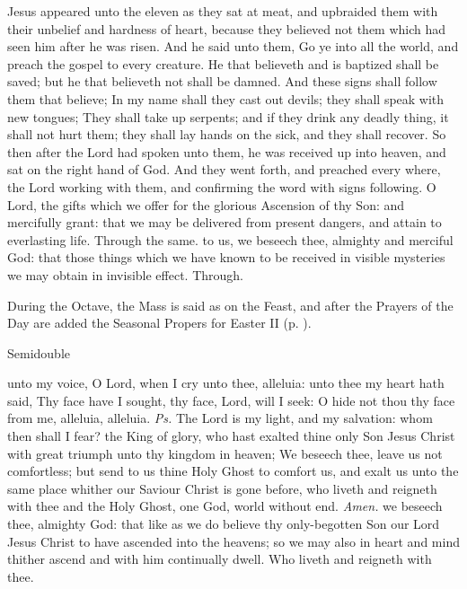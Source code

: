  Jesus appeared unto the eleven as they sat at meat, and upbraided them with their unbelief and hardness of heart, because they believed not them which had seen him after he was risen. And he said unto them, Go ye into all the world, and preach the gospel to every creature. He that believeth and is baptized shall be saved; but he that believeth not shall be damned. And these signs shall follow them that believe; In my name shall they cast out devils; they shall speak with new tongues; They shall take up serpents; and if they drink any deadly thing, it shall not hurt them; they shall lay hands on the sick, and they shall recover. So then after the Lord had spoken unto them, he was received up into heaven, and sat on the right hand of God. And they went forth, and preached every where, the Lord working with them, and confirming the word with signs following.
\secret
{} O Lord, the gifts which we offer for the glorious Ascension of thy Son: and mercifully grant: that we may be delivered from present dangers, and attain to everlasting life. Through the same.
\postcommunion
{} to us, we beseech thee, almighty and merciful God: that those things which we have known to be received in visible mysteries we may obtain in invisible effect. Through.
\begin{rubric}
    During the Octave, the Mass is said as on the Feast, and after the Prayers of the Day are added the Seasonal Propers for Easter II (p. \pageref{EasterII}).
\end{rubric}

\begin{inhead}
    {Semidouble}
\end{inhead}

\properantiphonfix

\introit
{} unto my voice, O Lord, when I cry unto thee, alleluia: unto thee my heart hath said, Thy face have I sought, thy face, Lord, will I seek: O hide not thou thy face from me, alleluia, alleluia. \textit{Ps.} The Lord is my light, and my salvation: whom then shall I fear?
\collect
{} the King of glory, who hast exalted thine only Son Jesus Christ with great triumph unto thy kingdom in heaven; We beseech thee, leave us not comfortless; but send to us thine Holy Ghost to comfort us, and exalt us unto the same place whither our Saviour Christ is gone before, who liveth and reigneth with thee and the Holy Ghost, one God, world without end. \textit{Amen.}
 we beseech thee, almighty God: that like as we do believe thy only-begotten Son our Lord Jesus Christ to have ascended into the heavens; so we may also in heart and mind thither ascend and with him continually dwell. Who liveth and reigneth with thee.


